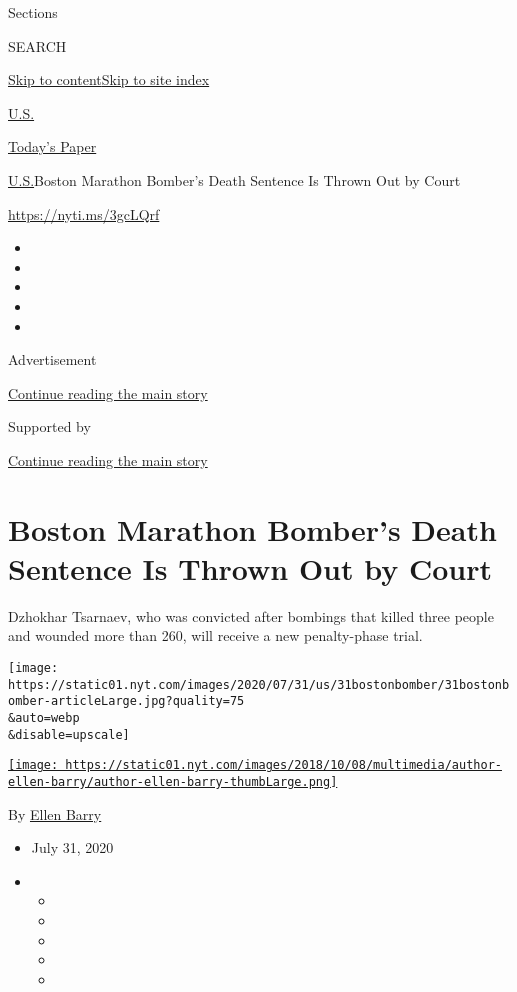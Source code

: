 Sections

SEARCH

\protect\hyperlink{site-content}{Skip to
content}\protect\hyperlink{site-index}{Skip to site index}

\href{https://www.nytimes.com/section/us}{U.S.}

\href{https://myaccount.nytimes.com/auth/login?response_type=cookie\&client_id=vi}{}

\href{https://www.nytimes.com/section/todayspaper}{Today's Paper}

\href{/section/us}{U.S.}\textbar{}Boston Marathon Bomber's Death
Sentence Is Thrown Out by Court

\url{https://nyti.ms/3gcLQrf}

\begin{itemize}
\item
\item
\item
\item
\item
\end{itemize}

Advertisement

\protect\hyperlink{after-top}{Continue reading the main story}

Supported by

\protect\hyperlink{after-sponsor}{Continue reading the main story}

\hypertarget{boston-marathon-bombers-death-sentence-is-thrown-out-by-court}{%
\section{Boston Marathon Bomber's Death Sentence Is Thrown Out by
Court}\label{boston-marathon-bombers-death-sentence-is-thrown-out-by-court}}

Dzhokhar Tsarnaev, who was convicted after bombings that killed three
people and wounded more than 260, will receive a new penalty-phase
trial.

\texttt{[image: https://static01.nyt.com/images/2020/07/31/us/31bostonbomber/31bostonbomber-articleLarge.jpg?quality=75\\\&auto=webp\\\&disable=upscale]}

\href{https://www.nytimes.com/by/ellen-barry}{\texttt{[image: https://static01.nyt.com/images/2018/10/08/multimedia/author-ellen-barry/author-ellen-barry-thumbLarge.png]}}

By \href{https://www.nytimes.com/by/ellen-barry}{Ellen Barry}

\begin{itemize}
\item
  July 31, 2020
\item
  \begin{itemize}
  \item
  \item
  \item
  \item
  \item
  \end{itemize}
\end{itemize}

